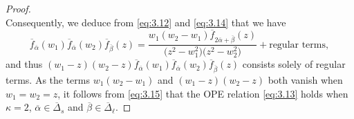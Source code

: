 \documentclass[10pt,a4paper]{amsart}
\numberwithin{equation}{section}
\begin{document}
\begin{proof}
\begin{equation}
\end{equation}
Consequently, we deduce from \eqref{eq:3.12} and \eqref{eq:3.14} that we have
\begin{equation}\label{eq:3.15}
\overline{f}_{\overline{\alpha}}(w_1) \overline{f}_{\overline{\alpha}}(w_2)
\overline{f}_{\overline{\beta}}(z)
=\frac{w_1(w_2-w_1)\overline{f}_{2\overline{\alpha}+ \overline{\beta}}(z)}{\bigl(z^2-w_1^2\bigr)\bigl(z^2-w_2^2\bigr)}+\text{regular terms},
\end{equation}
and thus $(w_1-z)(w_2-z)\overline{f}_{\overline{\alpha}}(w_1) \overline{f}_{\overline{\alpha}}(w_2) \overline{f}_{\overline{\beta}}(z)$ consists solely of regular terms. As the terms $w_1(w_2-w_1)$ and $(w_1-z)(w_2-z)$ both vanish when $w_1=w_2=z$, it follows from \eqref{eq:3.15} that the OPE relation \eqref{eq:3.13} holds when $\kappa=2$, $\overline{\alpha}\in\overline{\Delta}_s$ and $\overline{\beta}\in\overline{\Delta}_{\ell}$.


\end{proof}
\end{document}
